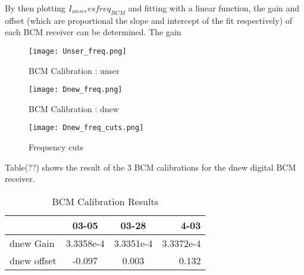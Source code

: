 By then plotting $I_{unser} vs freq_{BCM}$ and fitting with a linear function, the gain and offset (which are proportional the slope and intercept of the fit respectively) of each BCM receiver can be determined. The gain 



\begin{figure}[H]
\begin{center}
\texttt{[image: Unser\_freq.png]}
\end{center}
\caption{BCM Calibration : unser}
\end{figure}
\begin{figure}[H]
\begin{center}
\texttt{[image: Dnew\_freq.png]}
\end{center}
\caption{BCM Calibration : dnew}
\end{figure}


\begin{figure}[H]
\begin{center}
\texttt{[image: Dnew\_freq\_cuts.png]}
\end{center}
\caption{Frequency cuts}
\end{figure}

Table(??) shows the result of the 3 BCM calibrations for the dnew digital BCM receiver.
\begin{table}[ht]
\caption{BCM Calibration Results}
\begin{center}
\begin{tabular}{l| c| c| r}
   & 03-05 & 03-28 & 4-03 \\
\hline
dnew Gain & 3.3358e-4 & 3.3351e-4 & 3.3372e-4\\
\hline
dnew offset & -0.097  &   0.003   & 0.132         \\
\end{tabular}
\end{center}
\end{table}
